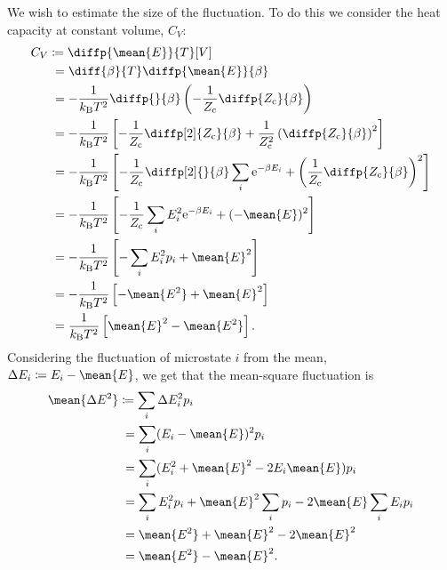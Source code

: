 \documentclass[fleqn]{NotesClass}
\newcommand*{\boltzmann}{k_{\mathrm{B}}}
\newcommand*{\cpartition}{Z_{\mathrm{c}}}
\newcommand*{\e}{\mathrm{e}}
\begin{document}
    We wish to estimate the size of the fluctuation.
    To do this we consider the heat capacity at constant volume, \(C_V\):
    \begingroup
    \allowdisplaybreaks
    \begin{align}
        C_V &\coloneqq \diffp{\smash{\mean{E}}}{T}[V]\\
        &\hphantom{:}= \diff{\beta}{T}\diffp{\mean{E}}{\beta}\\
        &\hphantom{:}= -\frac{1}{\boltzmann T^2} \diffp{}{\beta}\left( -\frac{1}{\cpartition} \diffp{\cpartition}{\beta} \right)\\
        &\hphantom{:}= -\frac{1}{\boltzmann T^2} \left[ -\frac{1}{\cpartition} \diffp[2]{\cpartition}{\beta} + \frac{1}{\cpartition^2} \left( \diffp{\cpartition}{\beta} \right)^2 \right]\\
        &\hphantom{:}= -\frac{1}{\boltzmann T^2} \left[ -\frac{1}{\cpartition} \diffp[2]{}{\beta} \sum_i \e^{-\beta E_i} + \left( \frac{1}{\cpartition} \diffp{\cpartition}{\beta} \right)^2 \right]\\
        &\hphantom{:}= -\frac{1}{\boltzmann T^2} \left[ -\frac{1}{\cpartition}\sum_i E_i^2\e^{-\beta E_i} + (-\mean{E})^2 \right]\\
        &\hphantom{:}= -\frac{1}{\boltzmann T^2} \left[ -\sum_i E_i^2p_i + \mean{E}^2 \right]\\
        &\hphantom{:}= -\frac{1}{\boltzmann T^2} \left[ -\mean{E^2} + \mean{E}^2 \right]\\
        &\hphantom{:}= \frac{1}{\boltzmann T^2} \left[ \mean{E}^2 - \mean{E^2} \right].
    \end{align}
    \endgroup
    Considering the fluctuation of microstate \(i\) from the mean, \(\Delta E_i \coloneqq E_i - \mean{E}\), we get that the mean-square fluctuation is
    \begin{align}
        \mean{\Delta E^2} &\coloneqq \sum_i \Delta E_i^2 p_i\\
        &\hphantom{:}= \sum_i (E_i - \mean{E})^2p_i\\
        &\hphantom{:}= \sum_i (E_i^2 + \mean{E}^2 - 2E_i\mean{E})p_i\\
        &\hphantom{:}= \sum_i E_i^2p_i + \mean{E}^2\sum_i p_i - 2\mean{E}\sum_i E_ip_i\\
        &\hphantom{:}= \mean{E^2} + \mean{E}^2 - 2\mean{E}^2\\
        &\hphantom{:}= \mean{E^2} - \mean{E}^2.
    \end{align}
    
\end{document}
